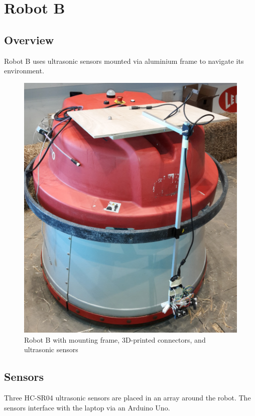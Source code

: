 \documentclass[11pt]{article}
\begin{document}
	\pagebreak

	\section{Robot B}
	
	\subsection{Overview}
	Robot B uses ultrasonic sensors mounted via aluminium frame to navigate its environment.
	
	\begin{figure}[h!]
		\centering
		\includegraphics[scale=0.1]{robot_b_full}
		\caption{Robot B with mounting frame, 3D-printed connectors, and ultrasonic sensors}
	\end{figure}
	
	\subsection{Sensors}
	Three HC-SR04 ultrasonic sensors are placed in an array around the robot. The sensors interface with the laptop via an Arduino Uno.
	
\end{document}
